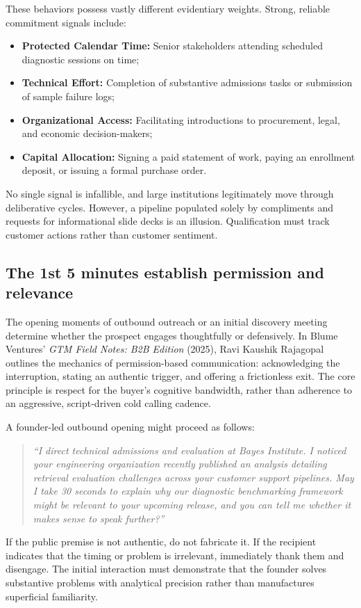 These behaviors possess vastly different evidentiary weights. Strong, reliable commitment signals include:
\begin{itemize}
\item \textbf{Protected Calendar Time:} Senior stakeholders attending scheduled diagnostic sessions on time;
\item \textbf{Technical Effort:} Completion of substantive admissions tasks or submission of sample failure logs;
\item \textbf{Organizational Access:} Facilitating introductions to procurement, legal, and economic decision-makers;
\item \textbf{Capital Allocation:} Signing a paid statement of work, paying an enrollment deposit, or issuing a formal purchase order.
\end{itemize}
No single signal is infallible, and large institutions legitimately move through deliberative cycles. However, a pipeline populated solely by compliments and requests for informational slide decks is an illusion. Qualification must track customer actions rather than customer sentiment.

\subsection{The 1st 5 minutes establish permission and relevance}

The opening moments of outbound outreach or an initial discovery meeting determine whether the prospect engages thoughtfully or defensively. In Blume Ventures' \textit{GTM Field Notes: B2B Edition} (2025), Ravi Kaushik Rajagopal outlines the mechanics of permission-based communication: acknowledging the interruption, stating an authentic trigger, and offering a frictionless exit. The core principle is respect for the buyer's cognitive bandwidth, rather than adherence to an aggressive, script-driven cold calling cadence.

A founder-led outbound opening might proceed as follows:
\begin{quote}
\textit{``I direct technical admissions and evaluation at Bayes Institute. I noticed your engineering organization recently published an analysis detailing retrieval evaluation challenges across your customer support pipelines. May I take 30 seconds to explain why our diagnostic benchmarking framework might be relevant to your upcoming release, and you can tell me whether it makes sense to speak further?''}
\end{quote}
If the public premise is not authentic, do not fabricate it. If the recipient indicates that the timing or problem is irrelevant, immediately thank them and disengage. The initial interaction must demonstrate that the founder solves substantive problems with analytical precision rather than manufactures superficial familiarity.


